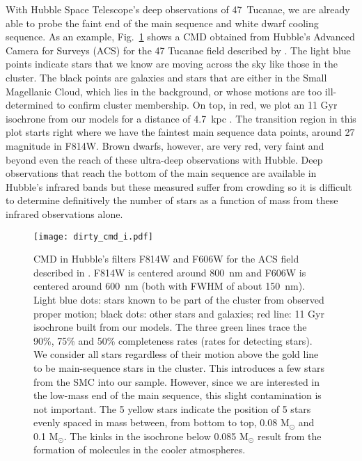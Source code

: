 \documentclass[useAMS,usenatbib]{mnras}
\begin{document}
With Hubble Space Telescope's deep observations of 47~Tucanae, we are already able to probe the faint end of the main sequence and white dwarf cooling sequence. As an example, Fig.~\ref{fig:clean_cmd} shows a CMD obtained from Hubble's Advanced Camera for Surveys (ACS) for the 47 Tucanae field described by \citet{1538-3881-143-1-11}.  The light blue points indicate stars that we know are moving across the sky like those in the cluster.  The black points are galaxies and stars that are either in the Small Magellanic Cloud, which lies in the background, or whose motions are too ill-determined to confirm cluster membership. On top, in red, we plot an 11 Gyr isochrone from our models for a distance of 4.7~kpc \citep{2012AJ....143...50W}. The transition region in this plot starts right where we have the faintest main sequence data points, around 27 magnitude in F814W.  Brown dwarfs, however, are very red, very faint and beyond even the reach of these ultra-deep observations with Hubble. Deep observations that reach the bottom of the main sequence are  available in Hubble's infrared bands \citep{2016ApJ...823...18C} but these measured suffer from crowding so it is difficult to determine definitively the number of stars as a function of mass from these infrared observations alone.  

\begin{figure}
\texttt{[image: dirty\_cmd\_i.pdf]}
\caption{CMD in Hubble's filters F814W and F606W for the ACS field described in \citep{1538-3881-143-1-11}. F814W is centered around 800~nm and F606W is centered around 600~nm (both with FWHM of about 150~nm). Light blue dots: stars known to be part of the cluster from observed proper motion; black dots: other stars and galaxies; red line: 11 Gyr isochrone built from our models. The three green lines trace the 90\%, 75\% and 50\% completeness rates (rates for detecting stars). We consider all stars regardless of their motion above the gold line to be main-sequence stars in the cluster.  This introduces a few stars from the SMC into our sample.  However, since we are interested in the low-mass end of the main sequence, this slight contamination is not important. The 5 yellow stars indicate the position of 5 stars evenly spaced in mass between, from bottom to top, 0.08 M$_\odot$ and 0.1 M$_\odot$. The kinks in the isochrone below 0.085 M$_\odot$ result from the formation of molecules in the cooler atmospheres.}
\label{fig:clean_cmd}
\end{figure}
\end{document}

